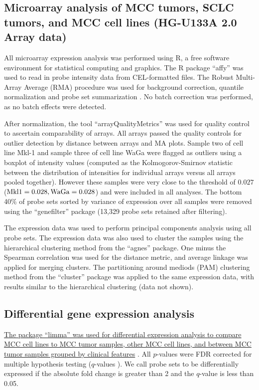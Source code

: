 \documentclass[10pt]{article}
\begin{document}
\subsection*{Microarray analysis of MCC tumors, SCLC tumors, and MCC cell lines (HG-U133A 2.0 Array data)}

All microarray expression analysis was performed using R, a free software environment for statistical computing and graphics.
The R package ``affy'' \citep{Gautier2004Affyanalysis} was used to read in probe intensity data from CEL-formatted files.
The Robust Multi-Array Average (RMA) procedure was used for background correction, quantile normalization and probe set summarization \citep{Irizarry2003Exploration}.
No batch correction was performed, as no batch effects were detected.

After normalization, the tool ``arrayQualityMetrics'' was used for quality control to ascertain comparability of arrays.
All arrays passed the quality controls for outlier detection by distance between arrays and MA plots.
Sample two of cell line Mkl-1 and sample three of cell line WaGa were flagged as outliers using a boxplot of intensity values (computed as the Kolmogorov-Smirnov statistic between the distribution of intensities for individual arrays versus all arrays pooled together).
However these samples were very close to the threshold of $0.027$ ($\mathrm{Mkl\-1}=0.028,\mathrm{WaGa}=0.028$) and were included in all analyses.
The bottom 40\% of probe sets sorted by variance of expression over all samples were removed using the ``genefilter'' package (13,329 probe sets retained after filtering).

The expression data was used to perform principal components analysis using all probe sets.
The expression data was also used to cluster the samples using the hierarchical clustering method from the ``agnes'' package.
One minus the Spearman correlation was used for the distance metric, and average linkage was applied for merging clusters.
The partitioning around mediods (PAM) clustering method from the ``cluster'' package was applied to the same expression data, with results similar to the hierarchical clustering (data not shown).

\subsection*{Differential gene expression analysis}

\uline{The package ``limma'' was used for differential expression analysis to compare MCC cell lines to MCC tumor samples, other MCC cell lines, and between MCC tumor samples grouped by clinical features}  \citep{Smyth2004Linear,Smyth2005Limma}.
All $p$-values were FDR corrected for multiple hypothesis testing ($q$-values \citep{Benjamini1995Controlling}).
We call probe sets to be differentially expressed if the absolute fold change is greater than 2 and the $q$-value is less than 0.05.
\end{document}
